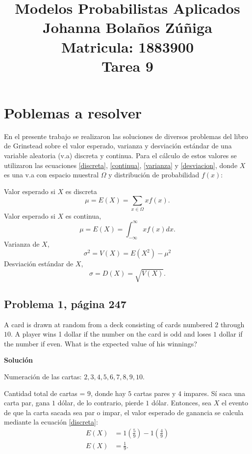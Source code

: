 \documentclass{article}
\title{
\centering
Modelos Probabilistas Aplicados \\
Johanna Bolaños Zúñiga \\
Matricula: 1883900\\
Tarea 9
}
\date{}
\begin{document}
\maketitle

\section{Poblemas a resolver}
En el presente trabajo se realizaron las soluciones de diversos problemas del libro de Grinstead \cite{librop} sobre el valor esperado, varianza y desviación estándar de una variable aleatoria (v.a) discreta y continua. Para el cálculo de estos valores se utilizaron las ecuaciones \ref{discreta}, \ref{continua}, \ref{varianza} y \ref{desviacion}, donde $X$ es una v.a con espacio muestral $\Omega$ y distribución de probabilidad $f{(x)}$:

\noindent Valor esperado si $X$ es discreta 
\begin{equation}
\mu = E{(X)} = \sum_{x \in \Omega}xf(x).
\label{discreta}
\end{equation}
\noindent Valor esperado si $X$ es continua,
\begin{equation}
\mu = E{(X)} = \int_{-\infty}^{\infty}xf(x)dx.
\label{continua}
\end{equation}
\noindent Varianza de $X$,
\begin{equation}
\sigma^2 = V(X)= E{(X^2)} - \mu^2
\label{varianza}
\end{equation}
\noindent Desviación estándar de $X$,
\begin{equation}
\sigma = D(X)= \sqrt{V(X)}.
\label{desviacion}
\end{equation}

\subsection{Problema 1, página 247}
A card is drawn at random from a deck consisting of cards numbered $2$ through $10$. A player wins 1 dollar if the number on the card is odd and loses $1$ dollar if the number if even. What is the expected value of his winnings?

\noindent \textbf{Solución}

\noindent Numeración de las cartas: $2, 3, 4, 5, 6, 7, 8, 9, 10$. 

\noindent Cantidad total de cartas = $9$, donde hay $5$ cartas pares y $4$ impares. Sí saca una carta par, gana $1$ dólar, de lo contrario, pierde $1$ dólar. Entonces, sea $X$ el evento de que la carta sacada sea par o impar, el valor esperado de ganancia se calcula mediante la ecuación \ref{discreta}:
\begin{align}
    \nonumber
    E{(X)} & = 1\left(\frac{5}{9}\right) - 1\left(\frac{4}{9} \right) \\ \nonumber
    E{(X)} & = \frac{1}{9}.
\end{align}
\end{document}
